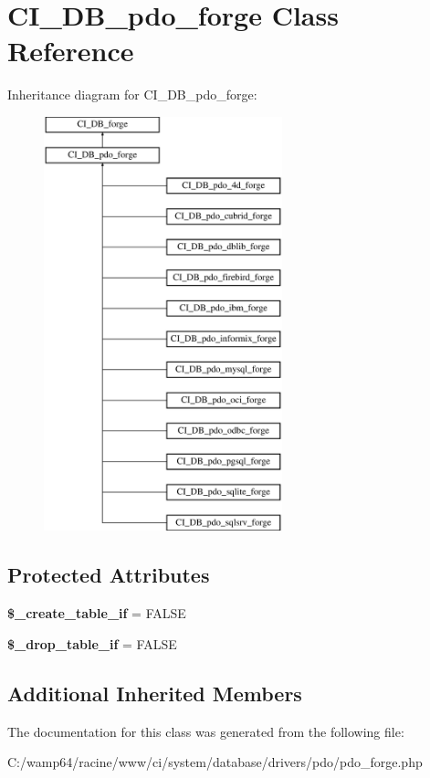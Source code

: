 \hypertarget{class_c_i___d_b__pdo__forge}{}\section{C\+I\+\_\+\+D\+B\+\_\+pdo\+\_\+forge Class Reference}
\label{class_c_i___d_b__pdo__forge}
Inheritance diagram for C\+I\+\_\+\+D\+B\+\_\+pdo\+\_\+forge\+:\begin{figure}[H]
\begin{center}
\leavevmode
\includegraphics[height=12.000000cm]{class_c_i___d_b__pdo__forge}
\end{center}
\end{figure}
\subsection*{Protected Attributes}
\begin{DoxyCompactItemize}
\item 
\mbox{\label{class_c_i___d_b__pdo__forge_a3d3803a5c695efe23010e502fd7bc042}} 
{\bfseries \$\+\_\+create\+\_\+table\+\_\+if} = F\+A\+L\+SE
\item 
\mbox{\label{class_c_i___d_b__pdo__forge_a7d66d376d02a20f90b685aab9d743a4b}} 
{\bfseries \$\+\_\+drop\+\_\+table\+\_\+if} = F\+A\+L\+SE
\end{DoxyCompactItemize}
\subsection*{Additional Inherited Members}


The documentation for this class was generated from the following file\+:\begin{DoxyCompactItemize}
\item 
C\+:/wamp64/racine/www/ci/system/database/drivers/pdo/pdo\+\_\+forge.\+php\end{DoxyCompactItemize}
